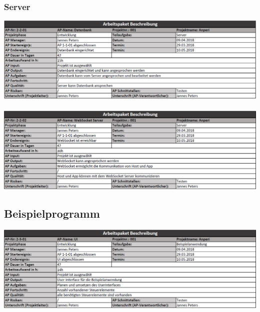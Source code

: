 \documentclass{scrartcl}
\begin{document}
\subsubsection{Server}
\includegraphics[scale=0.6]{AP2-2-01.png}
\\
\\
\includegraphics[scale=0.6]{AP2-2-02.png}
\subsection{Beispielprogramm}
\includegraphics[scale=0.6]{AP2-3-01.png}
\end{document}
